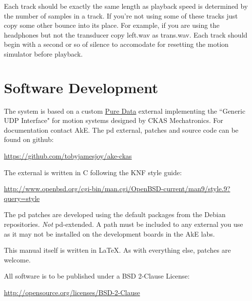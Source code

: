 \documentclass{article}
\begin{document}
	Each track should be exactly the same length as playback speed is 
	determined by the number of samples in a track. If you're not using some of 
	these tracks just copy some other bounce into its place. For example, if 
	you are using the headphones but not the transducer copy left.wav as 
	trans.wav. Each track should begin with a second or so of silence to 
	accomodate for resetting the motion simulator before playback. 

	\newpage
	\section{Software Development}
	\label{dev}
	The system is based on a custom \href{http://puredata.info}{Pure Data} 
	external implementing the ``Generic UDP Interface" for motion systems 
	designed by CKAS Mechatronics. For documentation contact AkE. The pd
	external, patches and source code can be found on github:

	\url{https://github.com/tobyjamesjoy/ake-ckas}\medskip

	The external is written in C following the KNF style guide: 
	
	\url{http://www.openbsd.org/cgi-bin/man.cgi/OpenBSD-current/man9/style.9?query=style}\medskip

	The pd patches are developed using the default packages from the Debian 
	repositories. \emph{Not} pd-extended. A path must be included to any 
	external you use as it may not be installed on the development boards in 
	the AkE labs.\medskip

	This manual itself is written in \LaTeX. As with everything else, patches 
	are welcome.\medskip

	All software is to be published under a BSD 2-Clause License:

	\url{http://opensource.org/licenses/BSD-2-Clause}
\end{document}
